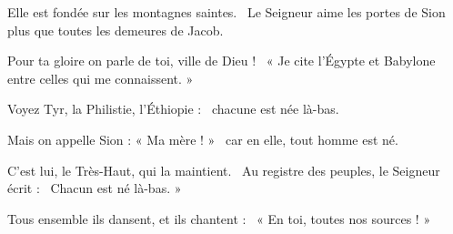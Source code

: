 \item Elle est fondée sur les montagnes saintes.~\pscross{} Le Seigneur aime les portes de Sion~\psstar{} plus que toutes les demeures de Jacob.
\item Pour ta gloire on parle de toi, ville de Dieu !~\psstar{} « Je cite l'Égypte et Babylone entre celles qui me connaissent. »
\item Voyez Tyr, la Philistie, l'Éthiopie :~\psstar{} chacune est née là-bas.
\item Mais on appelle Sion : « Ma mère ! »~\psstar{} car en elle, tout homme est né. 
\item C'est lui, le Très-Haut, qui la maintient.~\pscross{} Au registre des peuples, le Seigneur écrit :~\psstar{} Chacun est né là-bas. »
\item Tous ensemble ils dansent, et ils chantent :~\psstar{} « En toi, toutes nos sources ! »
